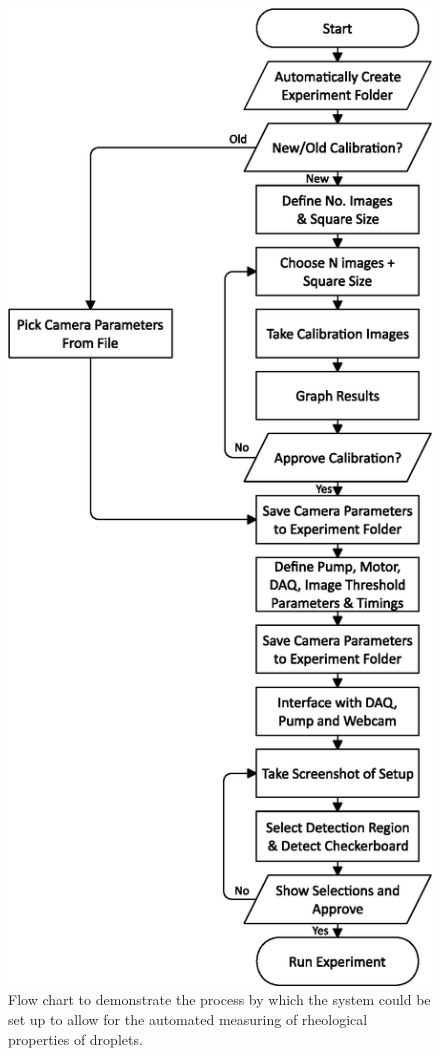 \documentclass{physics_article_B}
\begin{document}
        \begin{figure}[H]
            \centering
            \hspace*{-5.4cm}\includegraphics[scale=0.8]{Figures/FlowSetup.eps}
            \caption{Flow chart to demonstrate the process by which the system could be set up to allow for the automated measuring of rheological properties of droplets.}
            \label{fig:setup:flow}
        \end{figure}
        
\end{document}
